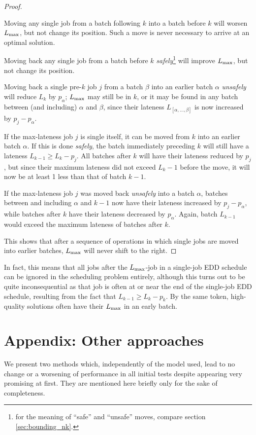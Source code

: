 \documentclass[13pt, letterpaper, oneside]{book}
\begin{document}
\begin{proposition}
\begin{proof}
\begin{alist}
\item{Moving any single job from a batch following $k$ into a batch before $k$ will
worsen $L_{\text{max}}$, but not change its position. Such a move is never necessary to
arrive at an optimal solution.}
\item{Moving back any single job from a
batch before $k$ \textit{safely}\footnote{for the meaning of ``safe'' and
``unsafe'' moves, compare section \ref{sec:bounding_nk}.} will improve $L_{\text{max}}$,
but not change its position.}
\item{Moving back a single pre-$k$ job $j$ from a batch
$\beta$ into an earlier batch $\alpha$ \textit{unsafely} will reduce $L_k$ by
$p_\alpha$; $L_{\text{max}}$ may still be in $k$, or it may be found in any batch between
(and including) $\alpha$ and $\beta$, since their lateness
$L_{[\alpha,\dots,\beta]}$ is now increased by $p_j - p_\alpha$.}
\item{If the
max-lateness job $j$ is single itself, it can be moved from $k$ into an earlier
batch $\alpha$. If this is done \textit{safely}, the batch immediately preceding
$k$ will still have a lateness $L_{k-1} \geq L_k - p_j$. All batches after $k$
will have their lateness reduced by $p_j$, but since their maximum lateness did
not exceed $L_k - 1$ before the move, it will now be at least 1 less than that
of batch $k-1$.}
\item{If the max-lateness job
$j$ was moved back \textit{unsafely} into a batch $\alpha$, batches between and
including $\alpha$ and $k-1$ now have their lateness increased by $p_j - p_\alpha$,
while batches after $k$ have their lateness decreased by $p_\alpha$. Again,
batch $L_{k-1}$ would exceed the maximum lateness of batches after $k$.}
\end{alist}
This shows that after a sequence of operations in which single jobs are moved into
earlier batches, $L_{\text{max}}$ will never shift to the right. 
\end{proof}
\end{proposition}
In fact, this means that all jobs after the $L_{\text{max}}$-job in a single-job EDD
schedule can be ignored in the scheduling problem entirely, although this turns
out to be quite inconsequential as that job is often at or near the end of the
single-job EDD schedule, resulting from the fact that $L_{k-1} \geq L_k - p_k$.
By the same token, high-quality solutions often have their $L_{\text{max}}$ in an early
batch.

\chapter{Appendix: Other approaches}
We present two methods which, independently of the model used, lead to no change
or a worsening of performance in all initial tests despite appearing very
promising at first. They are mentioned here briefly only for the sake of
completeness.
\end{document}
